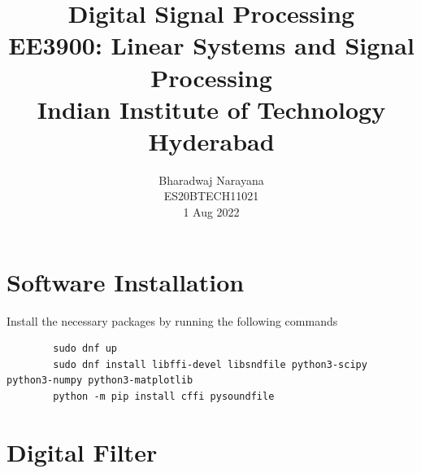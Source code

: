 \documentclass[journal,12pt,twocolumn]{IEEEtran}
\title{Digital Signal Processing \\ \Large EE3900: Linear Systems and Signal Processing \\ \large Indian Institute of Technology Hyderabad}
\author{Bharadwaj Narayana \\ \normalsize ES20BTECH11021 \\ \vspace*{20pt} \normalsize 1 Aug 2022}
\numberwithin{equation}{section}
\begin{document}
	\maketitle
	
	\section{Software Installation}
	Install the necessary packages by running the following commands
	\begin{lstlisting}
		sudo dnf up
		sudo dnf install libffi-devel libsndfile python3-scipy  python3-numpy python3-matplotlib 
		python -m pip install cffi pysoundfile 
	\end{lstlisting}

	\section{Digital Filter}
\end{document}
